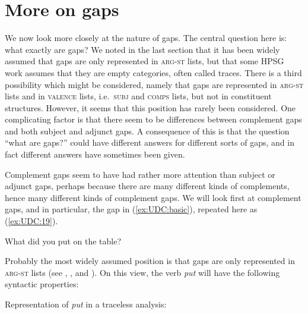 \documentclass[output=paper,biblatex,babelshorthands,newtxmath,draftmode,colorlinks,citecolor=brown]{langscibook}
\begin{document}
\section{More on gaps}
\label{sec:UDC:MoreOnGaps}


We now look more closely at the nature of gaps. The central question
here is: what exactly are gaps? We noted in the last section that it
has been widely assumed that gaps are only represented in
\textsc{arg-st} lists, but that some HPSG work assumes that they are
empty categories, often called traces. There is a third possibility
which might be considered, namely that gaps are represented in
\textsc{arg-st} lists and in \textsc{valence} lists,
i.e.\ \textsc{subj} and \textsc{comps} lists, but not in constituent
structures. However, it seems that this position has rarely been
considered. One complicating factor is that there seem to be
differences between complement gaps and both subject and adjunct
gaps. A consequence of this is that the question ``what are gaps?''
could have different answers for different sorts of gaps, and in fact
different answers have sometimes been given.

Complement gaps seem to have had rather more attention than subject or
adjunct gaps, perhaps because there are many different kinds of
complements, hence many different kinds of complement gaps. We will look
first at complement gaps, and in particular, the gap in (\ref{ex:UDC:basic}), repeated
here as (\ref{ex:UDC:19}).

\begin{exe}
\ex \label{ex:UDC:19}
What did you put \trace{} on the table?
\end{exe}

\noindent
Probably the most widely assumed position is that gaps are only
represented in \textsc{arg-st} lists
(see \citealt[Section~4.1]{Sag:97},
\citealt*[Section~2.2]{Bouma:Malouf:Sag:01},
\citealt[Chapter~5.1]{Ginzburg:Sag:01} and \citealt[508]{Sag:10a}). On
this view, the verb \textit{put} will have the
following syntactic properties:

\ea
\label{udc:ex-slashed-verb-traceless}
Representation of \emph{put} in a traceless analysis:\\
\z
\end{document}
